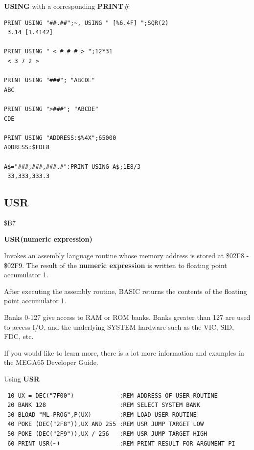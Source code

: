 \begin{description}[leftmargin=2cm,style=nextline]
\newpage
\item [Example:] {\bf USING} with a corresponding {\bf PRINT\#}

\begin{tcolorbox}[colback=black,coltext=white]
\verbatimfont{\codefont}
\begin{verbatim}
PRINT USING "##.##";~, USING " [%6.4F] ";SQR(2)
 3.14 [1.4142]

PRINT USING " < # # # > ";12*31
 < 3 7 2 >

PRINT USING "###"; "ABCDE"
ABC

PRINT USING ">###"; "ABCDE"
CDE

PRINT USING "ADDRESS:$%4X";65000
ADDRESS:$FDE8

A$="###,###,###.#":PRINT USING A$;1E8/3
 33,333,333.3
\end{verbatim}
\end{tcolorbox}
\end{description}


\newpage
\subsection{USR}
\begin{description}[leftmargin=2cm,style=nextline]
\item [Token:] \$B7
\item [Format:] {\bf USR(numeric expression)}
\item [Usage:] Invokes an assembly language routine whose memory
               address is stored at  \$02F8 - \$02F9. The
               result of the {\bf numeric expression}
               is written to floating point accumulator 1.

               After executing the assembly routine, BASIC returns
               the contents of the floating point accumulator 1.

\item [Remarks:] Banks 0-127 give access to RAM or ROM banks.
                 Banks greater than 127 are used to access I/O, and the underlying SYSTEM hardware such as the
                 VIC, SID, FDC, etc.

                 If you would like to learn more, there is a lot more
                 information and examples in the MEGA65 Developer Guide.

\item [Example:] Using {\bf USR}

\begin{tcolorbox}[colback=black,coltext=white]
\verbatimfont{\codefont}
\begin{verbatim}
 10 UX = DEC("7F00")             :REM ADDRESS OF USER ROUTINE
 20 BANK 128                     :REM SELECT SYSTEM BANK
 30 BLOAD "ML-PROG",P(UX)        :REM LOAD USER ROUTINE
 40 POKE (DEC("2F8")),UX AND 255 :REM USR JUMP TARGET LOW
 50 POKE (DEC("2F9")),UX / 256   :REM USR JUMP TARGET HIGH
 60 PRINT USR(~)                 :REM PRINT RESULT FOR ARGUMENT PI
\end{verbatim}
\end{tcolorbox}
\end{description}

